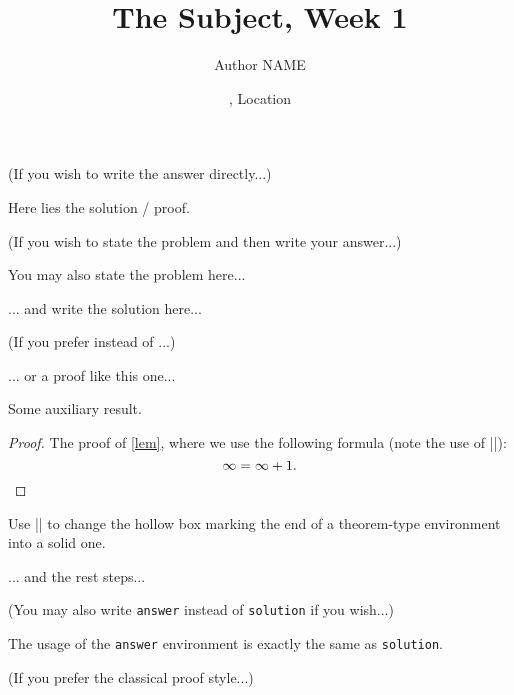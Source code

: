 \documentclass[11pt,
  logo = {example-image},
  title in boldface,
  theorem in new line,
  colored solution,
]{homework}
\title{The Subject, Week 1}
\author{Author NAME}
\date{\TheDate{2023-12-25}, Location}
\begin{document}
\textcolor{gray!55}{(If you wish to write the answer directly...)}

\begin{problem}
    Here lies the solution / proof.
\end{problem}


\bigskip\textcolor{gray!55}{(If you wish to state the problem and then write your answer...)}

\begin{problem}
    You may also state the problem here...
\end{problem}

\begin{solution}
    ... and write the solution here...
\end{solution}

\bigskip\textcolor{gray!55}{(If you prefer  instead of ...)}

\begin{solution}[Proof]
    ... or a proof like this one...
    \begin{lemma}\label{lem}
        Some auxiliary result.
    \end{lemma}
    \begin{proof}
        The proof of \cref{lem}, where we use the following formula (note the use of \cverb|\qedhere|):
        \[
            \infty = \infty + 1.
            \qedhere %
        \]
    \end{proof}
    \begin{fact}
        \proofless
        Use \cverb|\proofless| to change the hollow box marking the end of a theorem-type environment into a solid one.
    \end{fact}
    ... and the rest steps...
\end{solution}


\bigskip\textcolor{gray!55}{(You may also write \texttt{answer} instead of \texttt{solution} if you wish...)}

\begin{answer}
    The usage of the \verb|answer| environment is exactly the same as \verb|solution|.
\end{answer}


\enlargethispage*{\baselineskip}


\bigskip\textcolor{gray!55}{(If you prefer the classical proof style...)}
\end{document}
